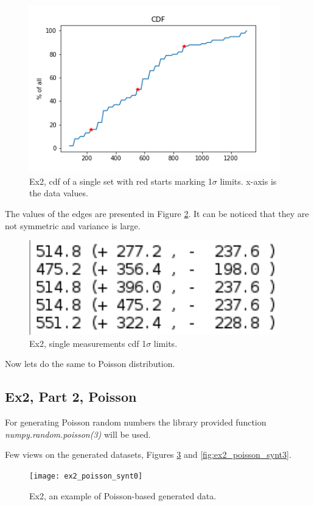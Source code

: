 \documentclass{article}
\begin{document}
\begin{figure}[!hbt]
	\centering
	\includegraphics[width=4.3in]{ex2_cdf}
	\caption{Ex2, cdf of a single set with red starts marking 1$\sigma$ limits. x-axis is the data values.}
	\label{fig:ex2_cdf}
\end{figure}

The values of the edges are presented in Figure \ref{fig:ex2_singlecdfresult}. It can be noticed that they are not symmetric and variance is large.

\begin{figure}[!hbt]
	\centering
	\includegraphics[width=4.3in]{ex2_singlecdfresult}
	\caption{Ex2, single measurements cdf 1$\sigma$ limits.}
	\label{fig:ex2_singlecdfresult}
\end{figure}

Now lets do the same to Poisson distribution.

\clearpage
\subsection*{Ex2, Part 2, Poisson}
For generating Poisson random numbers the library provided function \textit{numpy.random.poisson(3)} will be used.

Few views on the generated datasets, Figures \ref{fig:ex2_poisson_synt0} and \ref{fig:ex2_poisson_synt3}.

\begin{figure}[!hbt]
	\centering
	\texttt{[image: ex2\_poisson\_synt0]}
	\caption{Ex2, an example of Poisson-based generated data.}
	\label{fig:ex2_poisson_synt0}
\end{figure}
\end{document}
